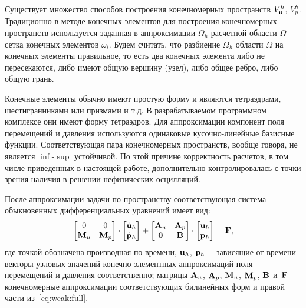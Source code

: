 Существует множество способов построения конечномерных пространств
$V_{\mathbf{u}}^h$, $V_p^h$. Традиционно в методе конечных элементов для
построения конечномерных пространств используется заданная в
аппроксимации $\Omega_h$ расчетной 
области $\Omega$ сетка конечных элементов $\omega_i$. Будем считать,
что разбиение $\Omega_h$ области $\Omega$ на конечных элементы
правильное, то есть два конечных элемента либо не пересекаются, либо
имеют общую вершину (узел), либо общее ребро, либо общую грань.

Конечные элементы обычно имеют простую форму и 
являются тетраэдрами, шестигранниками или призмами и т.д.
В разрабатываемом программном комплексе они имеют форму тетраэдров.
Для аппроксимации компонент поля
перемещений и давления используются одинаковые кусочно-линейные
базисные функции. Соответствующая пара конечномерных пространств,
вообще говоря, не является $\inf$-$\sup$ устойчивой. По этой причине
корректность расчетов, в том числе приведенных в настоящей работе,
дополнительно контролировалась с точки зрения наличия в решении
нефизических осцилляций.

После аппроксимации задачи по пространству соответствующая
система обыкновенных дифференциальных уравнений имеет вид:
%
\[
\begin{bmatrix}
0 & 0 \\
\tn{M}_u & \tn{M}_p
\end{bmatrix} \cdot
%
\begin{bmatrix}
\dot{\vc{u}}_h \\
\dot{\vc{p}}_h
\end{bmatrix} + 
%
\begin{bmatrix}
\tn{A}_u & \tn{A}_p \\
\tn{0} & \tn{B}
\end{bmatrix} \cdot
%
\begin{bmatrix}
\vc{u}_h \\
\vc{p}_h
\end{bmatrix} = \vc{F},
%
\]
%
где точкой обозначена производная по времени, $\mathbf{u}_h$,
$\mathbf{p}_h$~--
зависящие от времени векторы узловых значений конечно-элементных аппроксимаций поля
перемещений и давления соответственно;
матрицы $\mathbf{A}_u$, $\mathbf{A}_p$, $\mathbf{M}_u$, $\mathbf{M}_p$, $\mathbf{B}$ и~$\mathbf{F}$ ~-- конечномерные аппроксимации 
соответствующих билинейных форм и правой части из~\eqref{eq:weak:full}.

